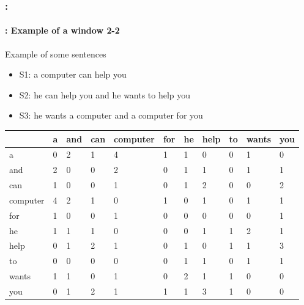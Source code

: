 \documentclass[xcolor=table]{beamer}
\begin{document}
\begin{frame}
	\frametitle{\insertshortsubtitle: \insertsection}
	\framesubtitle{\insertsubsection: Example of a window 2-2}

	\begin{exampleblock}{Example of some sentences}
		\begin{itemize}
			\item S1: a computer can help you
			\item S2: he can help you and he wants to help you
			\item S3: he wants a computer and a computer for you
		\end{itemize}
	\end{exampleblock}
	
	\begin{center}
		\scriptsize
		\begin{tabular}{lllllllllll}
			\hline\hline
			& a & and & can & computer & for & he & help & to & wants & you \\
			\hline
			a & 0 & 2 & 1 & 4 & 1 & 1 & 0 & 0 & 1 & 0\\
			and & 2 & 0 & 0 & 2 & 0 & 1 & 1 & 0 & 1 & 1\\
			can & 1 & 0 & 0 & 1 & 0 & 1 & 2 & 0 & 0 & 2\\
			computer & 4 & 2 & 1 & 0 & 1 & 0 & 1 & 0 & 1 & 1\\
			for & 1 & 0 & 0 & 1 & 0 & 0 & 0 & 0 & 0 & 1\\
			he & 1 & 1 & 1 & 0 & 0 & 0 & 1 & 1 & 2 & 1\\
			help & 0 & 1 & 2 & 1 & 0 & 1 & 0 & 1 & 1 & 3\\
			to & 0 & 0 & 0 & 0 & 0 & 1 & 1 & 0 & 1 & 1\\
			wants & 1 & 1 & 0 & 1 & 0 & 2 & 1 & 1 & 0 & 0\\
			you & 0 & 1 & 2 & 1 & 1 & 1 & 3 & 1 & 0 & 0\\
			\hline\hline
		\end{tabular}
	\end{center}

\end{frame}
\end{document}
